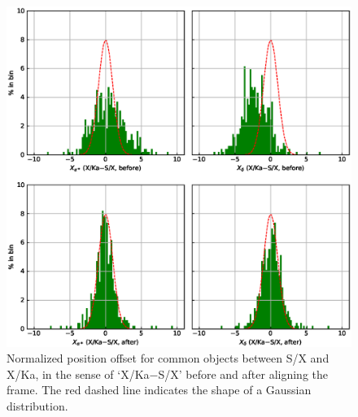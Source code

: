 \documentclass{aa}   %
\begin{document}
\begin{figure}[hbtp]
    \centering
    \includegraphics[width=160mm]{figs/nor-ra-dec-xka-sx-hist}
    \caption[]{\label{fig:nor-ra-dec-xka-sx-hist}
        Normalized position offset for common objects between S/X and X/Ka, in the sense of `X/Ka$-$S/X' before and after aligning the frame.
        The red dashed line indicates the shape of a Gaussian distribution.
    }
\end{figure}
\end{document}
